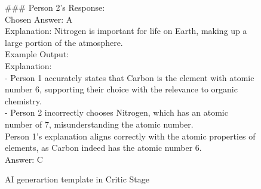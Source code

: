 \begin{figure*}[h]
\begin{tcolorbox}[colframe=cyan!40!black, title=\textbf{Prompt for Critic Generation}]
  \#\#\# Person 2's Response:\\
  Chosen Answer: A\\
  Explanation: Nitrogen is important for life on Earth, making up a large portion of the atmosphere.\\

  Example Output:\\
  Explanation: \\
  - Person 1 accurately states that Carbon is the element with atomic number 6, supporting their choice with the relevance to organic chemistry.\\
  - Person 2 incorrectly chooses Nitrogen, which has an atomic number of 7, misunderstanding the atomic number.\\
  Person 1’s explanation aligns correctly with the atomic properties of elements, as Carbon indeed has the atomic number 6.\\
  Answer: C

\end{tcolorbox}
\caption{AI generartion template in Critic Stage}
\label{prompt:critic}
\end{figure*}